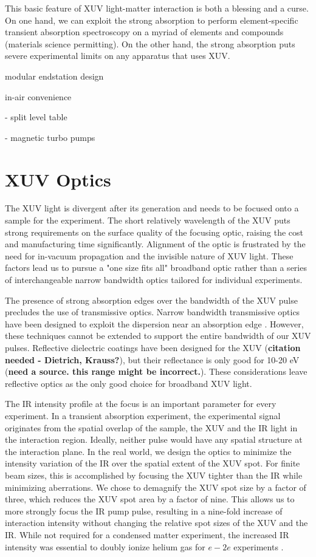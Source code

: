 This basic feature of XUV light-matter interaction is both a blessing and a curse. On one hand, we can exploit the strong absorption to perform element-specific transient absorption spectroscopy on a myriad of elements and compounds (materials science permitting). On the other hand, the strong absorption puts severe experimental limits on any apparatus that uses XUV.




modular endstation design

in-air convenience

- split level table

- magnetic turbo pumps


\section{XUV Optics}

The XUV light is divergent after its generation and needs to be focused onto a sample for the experiment. The short relatively wavelength of the XUV puts strong requirements on the surface quality of the focusing optic, raising the cost and manufacturing time significantly. Alignment of the optic is frustrated by the need for in-vacuum propagation and the invisible nature of XUV light. These factors lead us to pursue a "one size fits all" broadband optic rather than a series of interchangeable narrow bandwidth optics tailored for individual experiments.

The presence of strong absorption edges over the bandwidth of the XUV pulse precludes the use of transmissive optics. Narrow bandwidth transmissive optics have been designed to exploit the dispersion near an absorption edge \cite{drescherExtremeultravioletRefractiveOptics2018}. However, these techniques cannot be extended to support the entire bandwidth of our XUV pulses. Reflective dielectric coatings have been designed for the XUV (\textbf{citation needed - Dietrich, Krauss?}), but their reflectance is only good for 10-20 eV (\textbf{need a source. this range might be incorrect.}). These considerations leave reflective optics as the only good choice for broadband XUV light.

The IR intensity profile at the focus is an important parameter for every experiment. In a transient absorption experiment, the experimental signal originates from the spatial overlap of the sample, the XUV and the IR light in the interaction region. Ideally, neither pulse would have any spatial structure at the interaction plane. In the real world, we design the optics to minimize the intensity variation of the IR over the spatial extent of the XUV spot. For finite beam sizes, this is accomplished by focusing the XUV tighter than the IR while minimizing aberrations. We chose to demagnify the XUV spot size by a factor of three, which reduces the XUV spot area by a factor of nine. This allows us to more strongly focus the IR pump pulse, resulting in a nine-fold increase of interaction intensity without changing the relative spot sizes of the XUV and the IR. While not required for a condensed matter experiment, the increased IR intensity was essential to doubly ionize helium gas for $e-2e$ experiments \cite{kiesewetterDynamicsNearThresholdAttosecond2019}.

